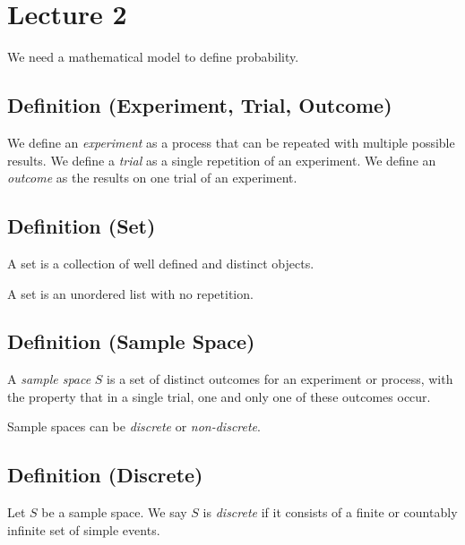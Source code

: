 \section{Lecture 2}

\textbf{}


We need a mathematical model to define probability.

\begin{defbox}
    \subsection{Definition (Experiment, Trial, Outcome)}
    We define an \emph{experiment} as a process that can be repeated with
    multiple possible results. We define a \emph{trial} as a single
    repetition of an experiment. We define an \emph{outcome} as
    the results on one trial of an experiment.
\end{defbox}

\begin{defbox}
    \subsection{Definition (Set)}
    A set is a collection of well defined and distinct objects.
\end{defbox}
\begin{remark}
    A set is an unordered list with no repetition.
\end{remark}

\begin{defbox}
    \subsection{Definition (Sample Space)}
    A \emph{sample space} $ S $ is a set of distinct outcomes for an experiment
    or process, with the property that in a single trial, one and only one of
    these outcomes occur.
\end{defbox}

Sample spaces can be \emph{discrete} or \emph{non-discrete}.
\begin{defbox}
    \subsection{Definition (Discrete)}
    Let $ S $ be a sample space. We say $ S $ is \emph{discrete} if it consists
    of a finite or countably infinite set of simple events.
\end{defbox}

